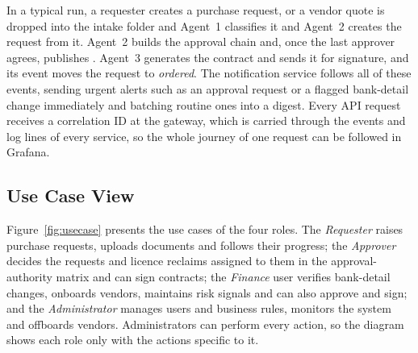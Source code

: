 In a typical run, a requester creates a purchase request, or a vendor quote is dropped into the intake folder and Agent~1 classifies it and Agent~2 creates the request from it. Agent~2 builds the approval chain and, once the last approver agrees, publishes . Agent~3 generates the contract and sends it for signature, and its  event moves the request to \emph{ordered}. The notification service follows all of these events, sending urgent alerts such as an approval request or a flagged bank-detail change immediately and batching routine ones into a digest. Every API request receives a correlation ID at the gateway, which is carried through the events and log lines of every service, so the whole journey of one request can be followed in Grafana.

\subsection{Use Case View}
Figure~\ref{fig:usecase} presents the use cases of the four roles. The \emph{Requester} raises purchase requests, uploads documents and follows their progress; the \emph{Approver} decides the requests and licence reclaims assigned to them in the approval-authority matrix and can sign contracts; the \emph{Finance} user verifies bank-detail changes, onboards vendors, maintains risk signals and can also approve and sign; and the \emph{Administrator} manages users and business rules, monitors the system and offboards vendors. Administrators can perform every action, so the diagram shows each role only with the actions specific to it.

